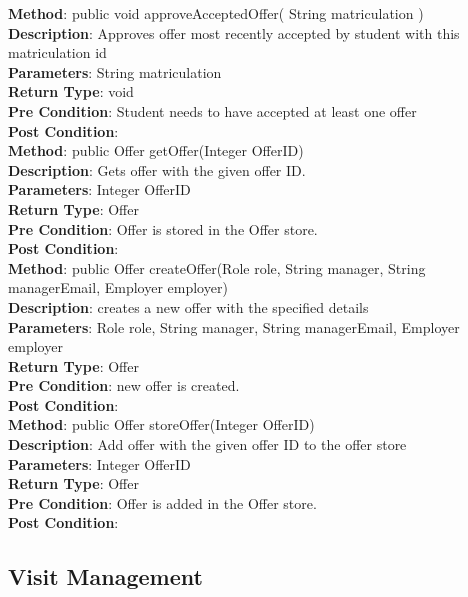 \documentclass{l3deliverable}
\begin{document}
\textbf{Method}: public void approveAcceptedOffer( String matriculation )\\
\textbf{Description}: Approves offer most recently accepted by student with this matriculation id\\
\textbf{Parameters}: String matriculation\\
\textbf{Return Type}: void\\
\textbf{Pre Condition}: Student needs to have accepted at least one offer \\
\textbf{Post Condition}:\\

\textbf{Method}: public Offer getOffer(Integer OfferID)\\
\textbf{Description}: Gets offer with the given offer ID.\\
\textbf{Parameters}: Integer OfferID\\
\textbf{Return Type}: Offer\\
\textbf{Pre Condition}: Offer is stored in the Offer store.\\
\textbf{Post Condition}:\\

\textbf{Method}: public Offer createOffer(Role role, String manager, String managerEmail, Employer employer)\\
\textbf{Description}: creates a new offer with the specified details\\
\textbf{Parameters}: Role role, String manager, String managerEmail, Employer employer \\
\textbf{Return Type}: Offer\\
\textbf{Pre Condition}: new offer is created.\\
\textbf{Post Condition}:\\

\textbf{Method}: public Offer storeOffer(Integer OfferID)\\
\textbf{Description}: Add offer with the given offer ID to the offer store\\
\textbf{Parameters}: Integer OfferID\\
\textbf{Return Type}: Offer\\
\textbf{Pre Condition}: Offer is added in the Offer store.\\
\textbf{Post Condition}:\\

\subsection{Visit Management}
\end{document}

